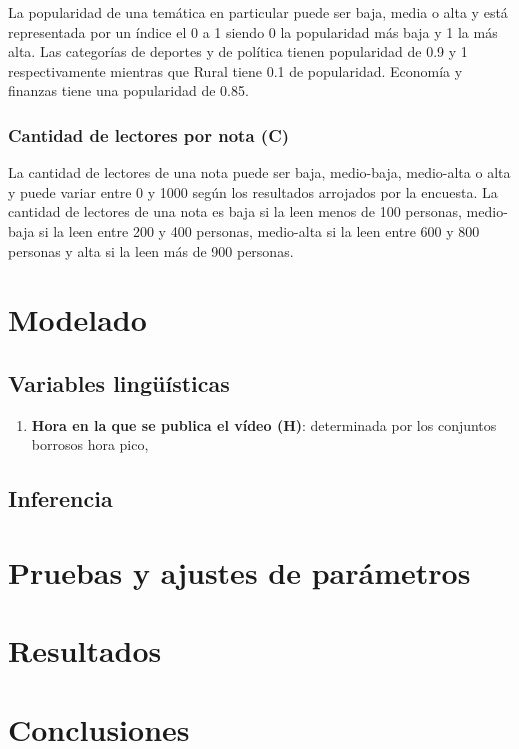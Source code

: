 \documentclass{article}
\begin{document}
La popularidad de una temática en particular puede ser baja, media o alta y está representada por un índice el 0 a 1 siendo 0 la popularidad más baja y 1 la más alta. Las categorías de deportes y de política tienen popularidad de 0.9 y 1 respectivamente mientras que Rural tiene 0.1 de popularidad. Economía y finanzas tiene una popularidad de 0.85.

\subsubsection*{Cantidad de lectores por nota (C)}

La cantidad de lectores de una nota puede ser baja, medio-baja, medio-alta o alta y puede variar entre 0 y 1000 según los resultados arrojados por la encuesta. La cantidad de lectores de una nota es baja si la leen menos de 100 personas, medio-baja si la leen entre 200 y 400 personas, medio-alta si la leen entre 600 y 800 personas y alta si la leen más de 900 personas.
\fi

\section{Modelado}

\subsection{Variables lingüísticas}

\begin{enumerate}
	\item \textbf{Hora en la que se publica el vídeo (H)}: determinada por los conjuntos borrosos hora pico, 
\end{enumerate}

\subsection{Inferencia}

\section{Pruebas y ajustes de parámetros}

\section{Resultados}

\section{Conclusiones}
\end{document}
